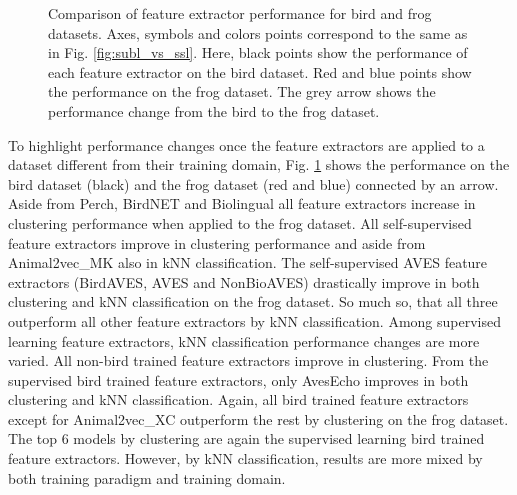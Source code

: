 \begin{figure}[ht]
    \centerline{}
    \caption{Comparison of feature extractor performance for bird and frog datasets. 
    Axes, symbols and colors points correspond to the same as in Fig. \ref{fig:subl_vs_ssl}.
    Here, black points show the performance of each feature extractor on the bird dataset.
    Red and blue points show the performance on the frog dataset. 
    The grey arrow shows the performance change from the bird to the frog dataset.}
    \label{fig:orig_vs_ump}
\end{figure}

To highlight performance changes once the feature extractors are applied to a dataset different from their training domain, Fig. \ref{fig:orig_vs_ump} shows the performance on the bird dataset (black) and the frog dataset (red and blue) connected by an arrow.
Aside from Perch, BirdNET and Biolingual all feature extractors increase in clustering performance when applied to the frog dataset.
All self-supervised feature extractors improve in clustering performance and aside from Animal2vec\_MK also in kNN classification.
The self-supervised AVES feature extractors (BirdAVES, AVES and NonBioAVES) drastically improve in both clustering and kNN classification on the frog dataset.
So much so, that all three outperform all other feature extractors by kNN classification.
Among supervised learning feature extractors, kNN classification performance changes are more varied.
All non-bird trained feature extractors improve in clustering.
From the supervised bird trained feature extractors, only AvesEcho improves in both clustering and kNN classification.
Again, all bird trained feature extractors except for Animal2vec\_XC outperform the rest by clustering on the frog dataset.
The top 6 models by clustering are again the supervised learning bird trained feature extractors.
However, by kNN classification, results are more mixed by both training paradigm and training domain.

